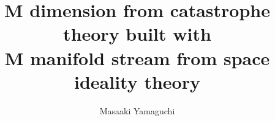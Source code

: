 \documentclass{jsarticle}
\begin{document}
\title{M dimension from catastrophe theory built with \\
M manifold stream from space ideality theory}
\author{Masaaki Yamaguchi}
\date{}
\maketitle
   \newcommand{\variint}{%
	\begin{picture}(15,30)
		\put(0,0){
			$ \iint $}
		\put(0,5){\line(15,0){15}}
	\end{picture} %
}
   \newcommand{\iiivariint}{%
	\begin{picture}(15,30)
		\put(0,0){
			\scalebox{1}[2]{$\iiint$}}
		\put(0,5){\line(15,0){15}}
                \put(0,4){\line(15,0){15}}
		\put(0,3){\line(15,0){15}}
	\end{picture} %
}
   \newcommand{\iiivar}{%
	\begin{picture}(15,30)
		\put(0,0){
			\scalebox{1}[2]{$ \int $}}
		\put(0,5){\line(15,0){15}}
                \put(0,4){\line(15,0){15}}
		\put(0,3){\line(15,0){15}}
	\end{picture} %
}



\newcommand{\variiint}{%
	\begin{picture}(15,15)
		\put(0,0){
			$ \iiint $}
		\put(0,5){\line(15,0){20}}
	\end{picture} %
}



 \newcommand{\alearletter}{%
	 \begin{picture}(10,20)
		 \put(0,0){
			 $ \square $}
		 \put(0,0){\line(1,1){10}}
	 \end{picture} %
	 }

 \newcommand{\secproduct}{%
	 \begin{picture}(10,20)
		 \put(0,0){
			 $ \nabla $}
		 \put(5,0){+}
	 \end{picture} %
	 }
 \newcommand{\talot}{%
	 \begin{picture}(15,20)
		 \put(0,0){
			 $ \text{\scalebox{2.0}[2]{$\nabla$}}$}
		 \put(5,3){
			 $ \Delta $}
	 \end{picture} %
	 }
 \newcommand{\hazerdnabla}{%
	 \begin{picture}(15,20)
		 \put(0,0){
			 $ \text{\scalebox{2.0}[2]{$\nabla$}}$}
		 \put(5,3){
			 $\text{Y}  $}
	 \end{picture} %
	 }

 \newcommand{\securebox}{%
	 \begin{picture}(15,20)
		 \put(0,0){
			 $ \text{\scalebox{2.0}[2]{$\square$}}$}
		 \put(5,3){
			 $\text{Y}  $}
	 \end{picture} %
	 }
\end{document}
